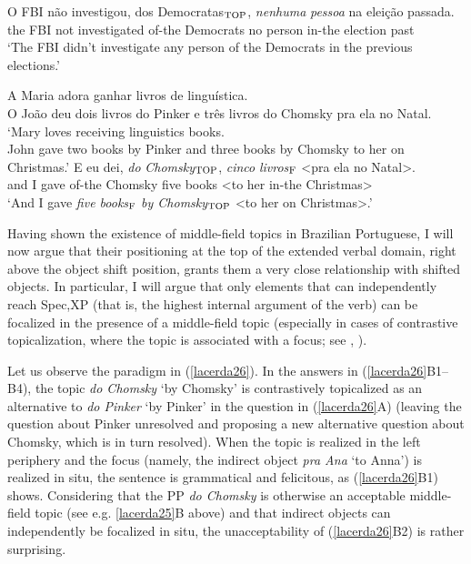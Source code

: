 \documentclass[output=paper]{langscibook}
\begin{document}
\begin{exe}
\ex \label{lacerda24}
\gll O 	FBI 	não 	investigou, 	dos 	Democratas$_{\textnormal{TOP}}$, 	\emph{nenhuma} 	\emph{pessoa}	na 	eleição 	passada.\\
the 	FBI 	not 	investigated 	of-the 	Democrats 	no 	person	in-the	election	past\\
\glt‘The FBI didn’t investigate any person of the Democrats in the previous elections.’\\

\ex \label{lacerda25}
\begin{xlist}
 \label{lacerda25A}
A Maria adora ganhar livros de linguística.\\
O João deu dois livros do Pinker e três livros do Chomsky pra ela no Natal.\\
`Mary loves receiving linguistics books.\\
John gave two books by Pinker and three books by Chomsky to her on Christmas.'
 \label{lacerda25B}
\gll E 	eu 	dei, 	\emph{do} 	\emph{Chomsky}$_{\textnormal{TOP}}$, 	\emph{cinco} 	\emph{livros}$_{\textnormal{F}}$ 	<pra 	ela 	no 	Natal>.\\
and	I 	gave 	of-the 	Chomsky 	five 	books 	<to 	her 	in-the 	Christmas>\\
\glt‘And I gave \emph{five books}$_{\textnormal{F}}$ \emph{by Chomsky}$_{\textnormal{TOP}}$ <to her on Christmas>.'

\end{xlist}
\end{exe}

Having shown the existence of middle-field topics in Brazilian Portuguese, I will now argue that their positioning at the top of the extended verbal domain, right above the object shift position, grants them a very close relationship with shifted objects. In particular, I will argue that only elements that can independently reach Spec,XP (that is, the highest internal argument of the verb) can be focalized in the presence of a middle-field topic (especially in cases of contrastive topicalization, where the topic is associated with a focus; see \citealt{Buring2003}, \citealt{Wagner2012}).

Let us observe the paradigm in (\ref{lacerda26}). In the answers in (\ref{lacerda26}B1--B4), the topic \emph{do Chomsky} ‘by Chomsky’ is contrastively topicalized as an alternative to \emph{do Pinker} ‘by Pinker’ in the question in (\ref{lacerda26}A) (leaving the question about Pinker unresolved and proposing a new alternative question about Chomsky, which is in turn resolved). When the topic is realized in the left periphery and the focus (namely, the indirect object \emph{pra Ana} ‘to Anna’) is realized in situ, the sentence is grammatical and felicitous, as (\ref{lacerda26}B1) shows. Considering that the PP \emph{do Chomsky} is otherwise an acceptable middle-field topic (see e.g. \ref{lacerda25}B above) and that indirect objects can independently be focalized in situ, the unacceptability of (\ref{lacerda26}B2) is rather surprising.
\end{document}
